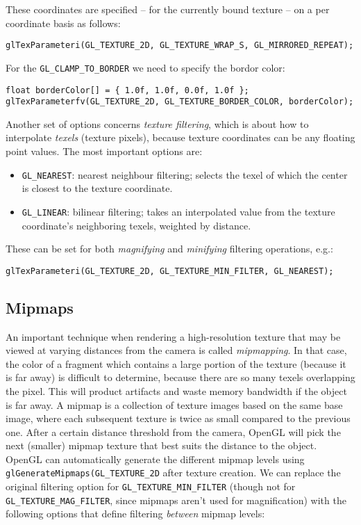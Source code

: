 \documentclass[8pt, table, xcdraw]{article}%
\begin{document}
These coordinates are specified -- for the currently bound texture -- on a per coordinate basis as follows:

\begin{lstlisting}
glTexParameteri(GL_TEXTURE_2D, GL_TEXTURE_WRAP_S, GL_MIRRORED_REPEAT);
\end{lstlisting}

For the \lstinline{GL_CLAMP_TO_BORDER} we need to specify the bordor color:

\begin{lstlisting}
float borderColor[] = { 1.0f, 1.0f, 0.0f, 1.0f };
glTexParameterfv(GL_TEXTURE_2D, GL_TEXTURE_BORDER_COLOR, borderColor);
\end{lstlisting}

Another set of options concerns \emph{texture filtering}, which is about how to interpolate \emph{texels} (texture pixels), because texture coordinates can be any floating point values. The most important options are:

\begin{itemize}
    \item \lstinline{GL_NEAREST}: nearest neighbour filtering; selects the texel of which the center is closest to the texture coordinate.
    \item \lstinline{GL_LINEAR}: bilinear filtering; takes an interpolated value from the texture coordinate's neighboring texels, weighted by distance.
\end{itemize}

These can be set for both \emph{magnifying} and \emph{minifying} filtering operations, e.g.:

\begin{lstlisting}
glTexParameteri(GL_TEXTURE_2D, GL_TEXTURE_MIN_FILTER, GL_NEAREST);
\end{lstlisting}

\subsection{Mipmaps}

An important technique when rendering a high-resolution texture that may be viewed at varying distances from the camera is called \emph{mipmapping}. In that case, the color of a fragment which contains a large portion of the texture (because it is far away) is difficult to determine, because there are so many texels overlapping the pixel. This will product artifacts and waste memory bandwidth if the object is far away. A mipmap is a collection of texture images based on the same base image, where each subsequent texture is twice as small compared to the previous one. After a certain distance threshold from the camera, OpenGL will pick the next (smaller) mipmap texture that best suits the distance to the object. OpenGL can automatically generate the different mipmap levels using \lstinline{glGenerateMipmaps(GL_TEXTURE_2D} after texture creation. We can replace the original filtering option for \lstinline{GL_TEXTURE_MIN_FILTER} (though not for \lstinline{GL_TEXTURE_MAG_FILTER}, since mipmaps aren't used for magnification) with the following options that define filtering \textit{between} mipmap levels:
\end{document}
